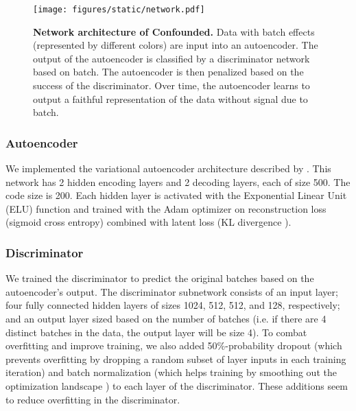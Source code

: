 \begin{figure}
	\centering
	\texttt{[image: figures/static/network.pdf]}
	\caption[Network architecture of Confounded]{\textbf{Network architecture of Confounded.}
	Data with batch effects (represented by different colors) are input into an autoencoder.
	The output of the autoencoder is classified by a discriminator network based on batch.
	The autoencoder is then penalized based on the success of the discriminator.
	Over time, the autoencoder learns to output a faithful representation of the data without signal due to batch.}
	\label{fig:network}
\end{figure}

\subsubsection{Autoencoder}

We implemented the variational autoencoder architecture \citep{louizos_variational_2015} described by \citet[Chapter 15]{geron_hands-machine_2017}.
This network has 2 hidden encoding layers and 2 decoding layers, each of size 500. %
The code size is 200. %
Each hidden layer is activated with the Exponential Linear Unit (ELU) function \citep{clevert_fast_2015} and trained with the Adam optimizer \citep{kingma_adam_2014} on reconstruction loss (sigmoid cross entropy) combined with latent loss (KL divergence \citep{kullback_information_1951}).

\subsubsection{Discriminator}

We trained the discriminator to predict the original batches based on the autoencoder's output.
The discriminator subnetwork consists of an input layer; four fully connected hidden layers of sizes 1024, 512, 512, and 128, respectively; and an output layer sized based on the number of batches (i.e. if there are 4 distinct batches in the data, the output layer will be size 4).
To combat overfitting and improve training, we also added 50\%-probability dropout \cite{srivastava_dropout_2014} (which prevents overfitting by dropping a random subset of layer inputs in each training iteration) and batch normalization \cite{ioffe_batch_2015} (which helps training by smoothing out the optimization landscape \citep{santurkar_how_2018}) to each layer of the discriminator.
These additions seem to reduce overfitting in the discriminator.

